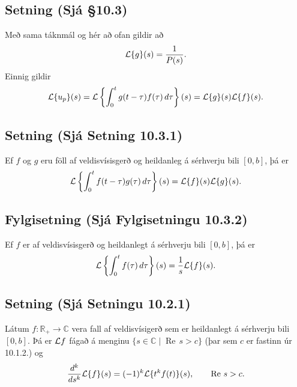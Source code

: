 \documentclass[a4paper,10pt,icelandic]{sphinxmanual}
\begin{document}
\subsection{Setning (Sjá \S{}10.3)}
\label{\detokenize{Kafli10:setning-sja-10-3}}
Með sama táknmál og hér að ofan gildir að
\begin{equation*}
\begin{split}{\cal L}\{g\}(s)=\frac{1}{P(s)}.\end{split}
\end{equation*}
Einnig gildir
\begin{equation*}
\begin{split}{\cal L}\{u_p\}(s)={\cal L}\left\{\int_0^tg(t-\tau)f(\tau)\, d\tau\right\}(s)=
{\cal L}\{g\}(s){\cal L}\{f\}(s).\end{split}
\end{equation*}

\subsection{Setning (Sjá Setning 10.3.1)}
\label{\detokenize{Kafli10:setning-sja-setning-10-3-1}}
Ef \(f\) og \(g\) eru föll af veldisvísisgerð og heildanleg á sérhverju bili \([0,b]\), þá er
\begin{equation*}
\begin{split}{\cal L}\left\{\int_0^tf(t-\tau)g(\tau)\, d\tau\right\}(s)=
{\cal L}\{f\}(s){\cal L}\{g\}(s).\end{split}
\end{equation*}

\subsection{Fylgisetning (Sjá Fylgisetningu 10.3.2)}
\label{\detokenize{Kafli10:fylgisetning-sja-fylgisetningu-10-3-2}}
Ef \(f\) er af veldisvísisgerð og heildanlegt á sérhverju bili \([0,b]\), þá er
\begin{equation*}
\begin{split}{\cal L}\left\{\int_0^t f(\tau) \, d\tau\right\}(s) = \dfrac 1s
{\cal L}\{f\}(s).\end{split}
\end{equation*}

\subsection{Setning (Sjá Setningu 10.2.1)}
\label{\detokenize{Kafli10:setning-sja-setningu-10-2-1}}
Látum \(f:\mathbb{R}_+\to {\mathbb{C}}\) vera fall af veldisvísigerð sem er heildanlegt á sérhverju bili \([0,b]\). Þá er \({\cal L}f\) fágað á menginu \(\{s\in {\mathbb{C}}\mid \operatorname{Re\, } s>c\}\) (þar sem \(c\) er fastinn úr 10.1.2.) og
\begin{equation*}
\begin{split}\frac{d^k}{ds^k}{\cal L}\{f\}(s)=(-1)^k{\cal L}\{t^kf(t)\}(s),\qquad \operatorname{Re\, } s>c.\end{split}
\end{equation*}
\end{document}
